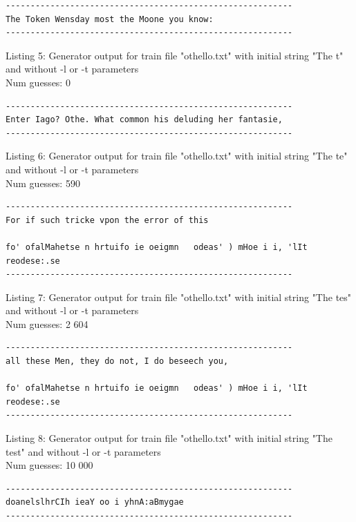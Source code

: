 \documentclass{article}
\begin{document}
\begin{lstlisting}
----------------------------------------------------------
The Token Wensday most the Moone you know:
----------------------------------------------------------
\end{lstlisting}

Listing 5: Generator output for train file "othello.txt" with initial string "The t" and without -l or -t parameters
\\Num guesses: 0

\begin{lstlisting}
----------------------------------------------------------
Enter Iago? Othe. What common his deluding her fantasie,
----------------------------------------------------------
\end{lstlisting}

Listing 6: Generator output for train file "othello.txt" with initial string "The te" and without -l or -t parameters
\\Num guesses: 590

\begin{lstlisting}
----------------------------------------------------------
For if such tricke vpon the error of this

fo' ofalMahetse n hrtuifo ie oeigmn   odeas' ) mHoe i i, 'lIt reodese:.se
----------------------------------------------------------
\end{lstlisting}

Listing 7: Generator output for train file "othello.txt" with initial string "The tes" and without -l or -t parameters
\\Num guesses: 2 604

\begin{lstlisting}
----------------------------------------------------------
all these Men, they do not, I do beseech you,

fo' ofalMahetse n hrtuifo ie oeigmn   odeas' ) mHoe i i, 'lIt reodese:.se
----------------------------------------------------------
\end{lstlisting}

Listing 8: Generator output for train file "othello.txt" with initial string "The test" and without -l or -t parameters
\\Num guesses: 10 000

\begin{lstlisting}
----------------------------------------------------------
doanelslhrCIh ieaY oo i yhnA:aBmygae
----------------------------------------------------------
\end{lstlisting}
\end{document}
